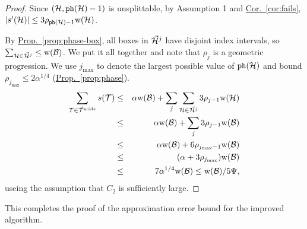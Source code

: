 \documentclass{acmsmall}
\newcommand{\cB}{{\cal B}}
\newcommand{\cH}{{\cal H}}
\newcommand{\cT}{{\cal T}}
\newcommand{\Prop}[1]{\hyperref[prop:#1]{Prop.~\ref*{prop:#1}}} %
\newcommand{\Cor}[1]{\hyperref[cor:#1]{Cor.~\ref*{cor:#1}}} %
\newcommand{\phase}{{\tt ph}}
\newcommand{\width}{{\bf {\rm  w}}}
\newcommand{\gridprec}{\alpha}
\newcommand{\errorcont}{\Psi}
\begin{document}
\begin{proof}
Since $(\cH,\phase(\cH)-1)$ is unsplittable, by Assumption 1 and \Cor{fails}, $|s'(\cH)| \leq 3\rho_{\phase(\cH)-1}\width(\cH)$.

By \Prop{phase-box}, all boxes in $\vec{\cH}^j$ have disjoint index intervals, so $\sum_{\cH \in \vec{\cH}^j} \leq \width(\cB)$.
We put it all together and note that $\rho_j$ is a geometric progression. We use $j_{\max}$ to denote the largest
possible value of $\phase(\cH)$ and bound $\rho_{j_{\max}} \leq 2\gridprec^{1/4}$ (\Prop{phase}).
%
\begin{eqnarray*}
\sum_{\cT \in \vec{\cT}^{wide}} s(\cT) & \leq & \gridprec \width(\cB)+ \sum_{j} \sum_{\cH \in \vec{\cH}^j} 3\rho_{j-1}\width(\cH)\\
& \leq & \gridprec \width(\cB)+ \sum_{j} 3\rho_{j-1} \width(\cB)\\
& \leq &  \gridprec \width(\cB) + 6 \rho_{j_{\max}-1}  \width(\cB) \\
& \leq & (\gridprec + 3 \rho_{j_{\max}}) \width(\cB)\\ 
& \leq &  7\gridprec^{1/4}\width(\cB) \leq \width(\cB)/5\errorcont,
\end{eqnarray*}
useing the assumption that $C_2$ is sufficiently large.
%
\end{proof}  

This completes the proof of the approximation error bound for the improved algorithm.
\end{document}
